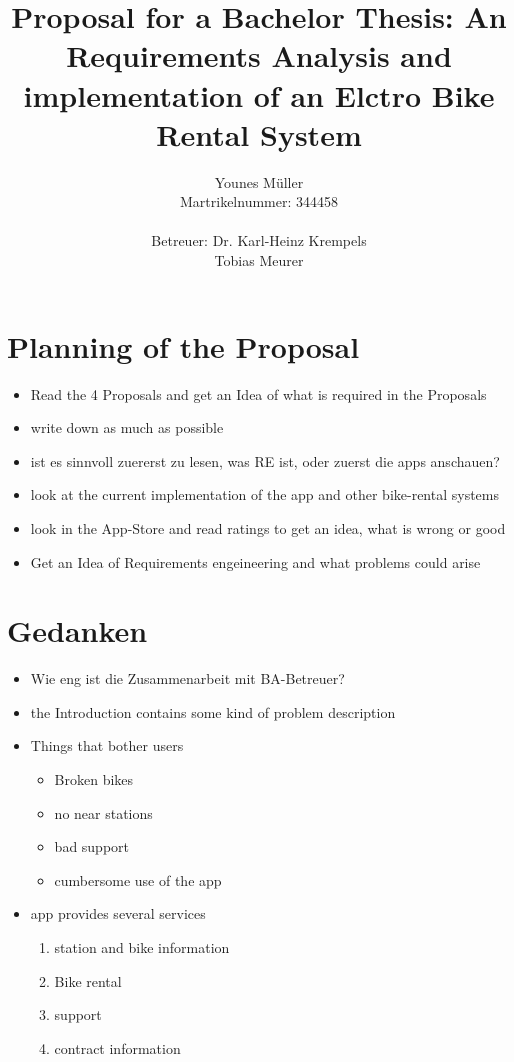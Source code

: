\documentclass{article}
\title{Proposal for a Bachelor Thesis: An Requirements Analysis and implementation of an Elctro Bike Rental System}
\author{Younes Müller\\ Martrikelnummer: 344458\\\\Betreuer: Dr. Karl-Heinz Krempels\\ Tobias Meurer}
\begin{document}
\maketitle
\pagebreak

\section{Planning of the Proposal}
\begin{itemize}
    \item Read the 4 Proposals and get an Idea of what is required in the Proposals
    \item write down as much as possible
    \item ist es sinnvoll zuererst zu lesen, was RE ist, oder zuerst die apps anschauen?
    \item look at the current implementation of the app and other bike-rental systems
    \item look in the App-Store and read ratings to get an idea, what is wrong or good 
    \item Get an Idea of Requirements engeineering and what problems could arise    
\end{itemize}


\section{Gedanken}
\begin{itemize}
    \item Wie eng ist die Zusammenarbeit mit BA-Betreuer?
    \item the Introduction contains some kind of problem description
    \item Things that bother users
    \begin{itemize}
        \item Broken bikes
        \item no near stations
        \item bad support
        \item cumbersome use of the app        
    \end{itemize}
    \item app provides several services
    \begin{enumerate}
        \item station and bike information
        \item Bike rental
        \item support
        \item contract information
    \end{enumerate}
\end{itemize}
\end{document}
